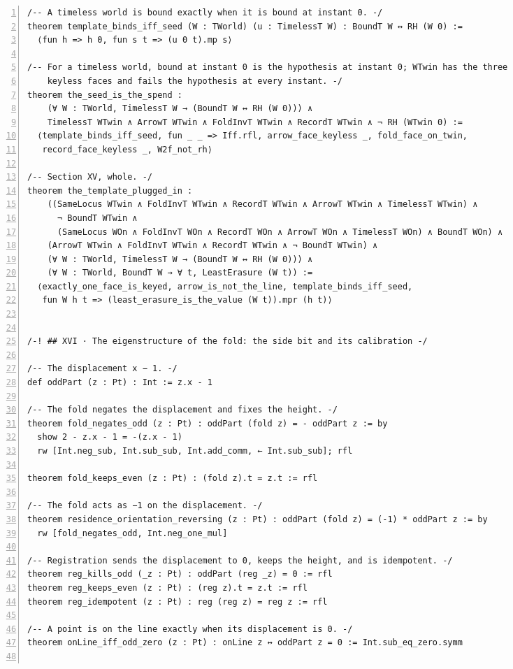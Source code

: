 \documentclass[10pt]{article}
\newcommand{\leansize}{\fontsize{5.5pt}{6.75pt}\selectfont}
\begin{document}
\begin{multicols}{2}
\begin{Verbatim}[numbers=left,firstnumber=1,numbersep=3pt,xleftmargin=2.6em,breaklines=true,breakanywhere=true,breakautoindent=false,breakindent=1.4em,breaksymbolleft={},breakanywheresymbolpre={},fontsize=\leansize]
/-- A timeless world is bound exactly when it is bound at instant 0. -/
theorem template_binds_iff_seed (W : TWorld) (u : TimelessT W) : BoundT W ↔ RH (W 0) :=
  ⟨fun h => h 0, fun s t => (u 0 t).mp s⟩

/-- For a timeless world, bound at instant 0 is the hypothesis at instant 0; WTwin has the three
    keyless faces and fails the hypothesis at every instant. -/
theorem the_seed_is_the_spend :
    (∀ W : TWorld, TimelessT W → (BoundT W ↔ RH (W 0))) ∧
    TimelessT WTwin ∧ ArrowT WTwin ∧ FoldInvT WTwin ∧ RecordT WTwin ∧ ¬ RH (WTwin 0) :=
  ⟨template_binds_iff_seed, fun _ _ => Iff.rfl, arrow_face_keyless _, fold_face_on_twin,
   record_face_keyless _, W2f_not_rh⟩

/-- Section XV, whole. -/
theorem the_template_plugged_in :
    ((SameLocus WTwin ∧ FoldInvT WTwin ∧ RecordT WTwin ∧ ArrowT WTwin ∧ TimelessT WTwin) ∧
      ¬ BoundT WTwin ∧
      (SameLocus WOn ∧ FoldInvT WOn ∧ RecordT WOn ∧ ArrowT WOn ∧ TimelessT WOn) ∧ BoundT WOn) ∧
    (ArrowT WTwin ∧ FoldInvT WTwin ∧ RecordT WTwin ∧ ¬ BoundT WTwin) ∧
    (∀ W : TWorld, TimelessT W → (BoundT W ↔ RH (W 0))) ∧
    (∀ W : TWorld, BoundT W → ∀ t, LeastErasure (W t)) :=
  ⟨exactly_one_face_is_keyed, arrow_is_not_the_line, template_binds_iff_seed,
   fun W h t => (least_erasure_is_the_value (W t)).mpr (h t)⟩


/-! ## XVI · The eigenstructure of the fold: the side bit and its calibration -/

/-- The displacement x − 1. -/
def oddPart (z : Pt) : Int := z.x - 1

/-- The fold negates the displacement and fixes the height. -/
theorem fold_negates_odd (z : Pt) : oddPart (fold z) = - oddPart z := by
  show 2 - z.x - 1 = -(z.x - 1)
  rw [Int.neg_sub, Int.sub_sub, Int.add_comm, ← Int.sub_sub]; rfl

theorem fold_keeps_even (z : Pt) : (fold z).t = z.t := rfl

/-- The fold acts as −1 on the displacement. -/
theorem residence_orientation_reversing (z : Pt) : oddPart (fold z) = (-1) * oddPart z := by
  rw [fold_negates_odd, Int.neg_one_mul]

/-- Registration sends the displacement to 0, keeps the height, and is idempotent. -/
theorem reg_kills_odd (_z : Pt) : oddPart (reg _z) = 0 := rfl
theorem reg_keeps_even (z : Pt) : (reg z).t = z.t := rfl
theorem reg_idempotent (z : Pt) : reg (reg z) = reg z := rfl

/-- A point is on the line exactly when its displacement is 0. -/
theorem onLine_iff_odd_zero (z : Pt) : onLine z ↔ oddPart z = 0 := Int.sub_eq_zero.symm


\end{Verbatim}
\end{multicols}
\end{document}
